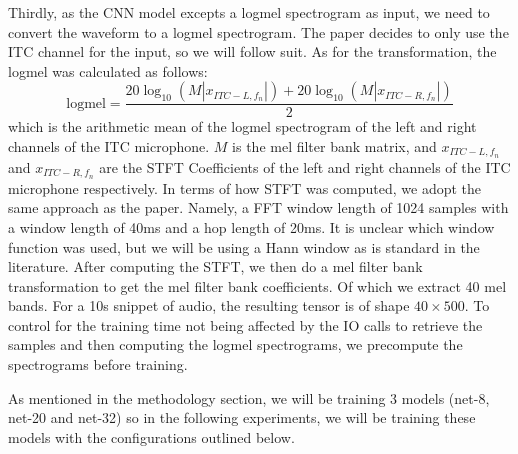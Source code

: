 \documentclass[logo,bsc,singlespacing,parskip,online]{infthesis}
\begin{document}
Thirdly, as the CNN model excepts a logmel spectrogram as input, we need to convert the waveform
to a logmel spectrogram. The paper decides to only use the ITC channel for the input, so we 
will follow suit.
As for the transformation, the logmel was calculated as follows:
\begin{equation}
\text{logmel} = \frac{20\log_{10}\left(M|x_{ITC-L, f_n}|\right) + 20\log_{10}\left(M|x_{ITC-R, f_n}|\right)}{2}
\label{eq:logmel}
\end{equation}
which is the arithmetic mean of the logmel spectrogram of the left and right channels of the ITC microphone.
$M$ is the mel filter bank matrix, and $x_{ITC-L, f_n}$ and $x_{ITC-R, f_n}$ are
the STFT Coefficients of the left and right channels of the ITC microphone respectively.
In terms of how STFT was computed, we adopt the same approach as the paper. Namely, 
a FFT window length of 1024 samples with a window length of 40ms and a hop length of 20ms. It is 
unclear which window function was used, but we will be using a Hann window as is standard in the literature.
After computing the STFT, we then do a mel filter bank transformation to get the mel filter bank coefficients. 
Of which we extract 40 mel bands. For a 10s snippet of audio, the resulting tensor is of shape $40 \times 500$.
To control for the training time not being affected by the IO 
calls to retrieve the samples and then computing the logmel spectrograms,
we precompute the spectrograms before training.

As mentioned in the methodology section, we will be training 3 models 
(net-8, net-20 and net-32) so in the following experiments, we will 
be training these models with the configurations outlined below.
\end{document}
